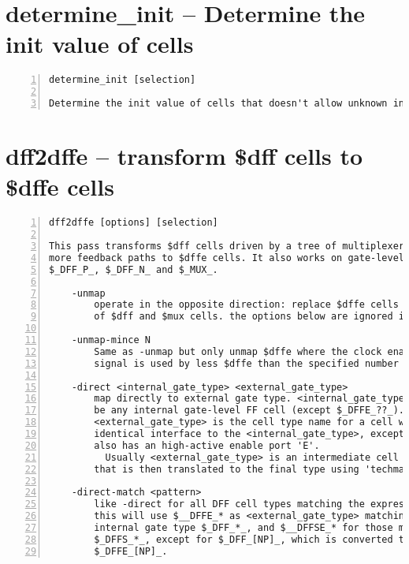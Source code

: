 \section{determine\_init -- Determine the init value of cells}
\label{cmd:determine_init}
\begin{lstlisting}[numbers=left,frame=single]
    determine_init [selection]

Determine the init value of cells that doesn't allow unknown init value.
\end{lstlisting}

\section{dff2dffe -- transform \$dff cells to \$dffe cells}
\label{cmd:dff2dffe}
\begin{lstlisting}[numbers=left,frame=single]
    dff2dffe [options] [selection]

This pass transforms $dff cells driven by a tree of multiplexers with one or
more feedback paths to $dffe cells. It also works on gate-level cells such as
$_DFF_P_, $_DFF_N_ and $_MUX_.

    -unmap
        operate in the opposite direction: replace $dffe cells with combinations
        of $dff and $mux cells. the options below are ignored in unmap mode.

    -unmap-mince N
        Same as -unmap but only unmap $dffe where the clock enable port
        signal is used by less $dffe than the specified number

    -direct <internal_gate_type> <external_gate_type>
        map directly to external gate type. <internal_gate_type> can
        be any internal gate-level FF cell (except $_DFFE_??_). the
        <external_gate_type> is the cell type name for a cell with an
        identical interface to the <internal_gate_type>, except it
        also has an high-active enable port 'E'.
          Usually <external_gate_type> is an intermediate cell type
        that is then translated to the final type using 'techmap'.

    -direct-match <pattern>
        like -direct for all DFF cell types matching the expression.
        this will use $__DFFE_* as <external_gate_type> matching the
        internal gate type $_DFF_*_, and $__DFFSE_* for those matching
        $_DFFS_*_, except for $_DFF_[NP]_, which is converted to 
        $_DFFE_[NP]_.
\end{lstlisting}

